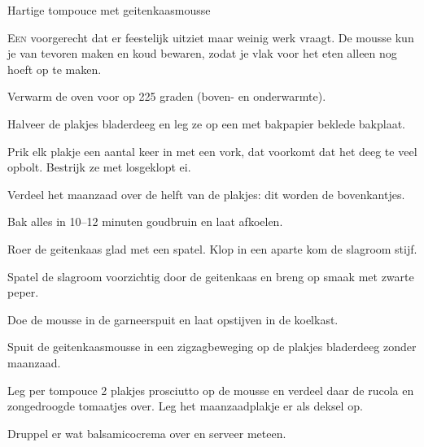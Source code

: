 \begin{recipe}{Hartige tompouce met geitenkaasmousse}


\lettrine{E}{en} voorgerecht dat er feestelijk uitziet maar weinig werk vraagt.
De mousse kun je van tevoren maken en koud bewaren, zodat je vlak voor het eten
alleen nog hoeft op te maken.

\begin{ingredients}
\end{ingredients}

\begin{steps}
  \item Verwarm de oven voor op 225 graden (boven- en onderwarmte).
  \item Halveer de plakjes bladerdeeg en leg ze op een met bakpapier beklede
    bakplaat. 
  \item Prik elk plakje een aantal keer in met een vork, dat voorkomt dat het deeg te
    veel opbolt. Bestrijk ze met losgeklopt ei.
  \item Verdeel het maanzaad over de helft van de plakjes: dit worden
    de bovenkantjes. 
  \item Bak alles in 10--12 minuten goudbruin en laat afkoelen.
  \item Roer de geitenkaas glad met een spatel. Klop in een aparte kom de
    slagroom stijf. 
  \item Spatel de slagroom voorzichtig door de geitenkaas en breng
    op smaak met zwarte peper. 
  \item Doe de mousse in de garneerspuit en laat opstijven
    in de koelkast.
  \item Spuit de geitenkaasmousse in een zigzagbeweging op de plakjes bladerdeeg
    zonder maanzaad. 
  \item Leg per tompouce 2 plakjes prosciutto op de mousse en
    verdeel daar de rucola en zongedroogde tomaatjes over. Leg het
    maanzaadplakje er als deksel op.
  \item Druppel er wat balsamicocrema over en serveer meteen.
\end{steps}
\vspace{14pt}
\end{recipe}
